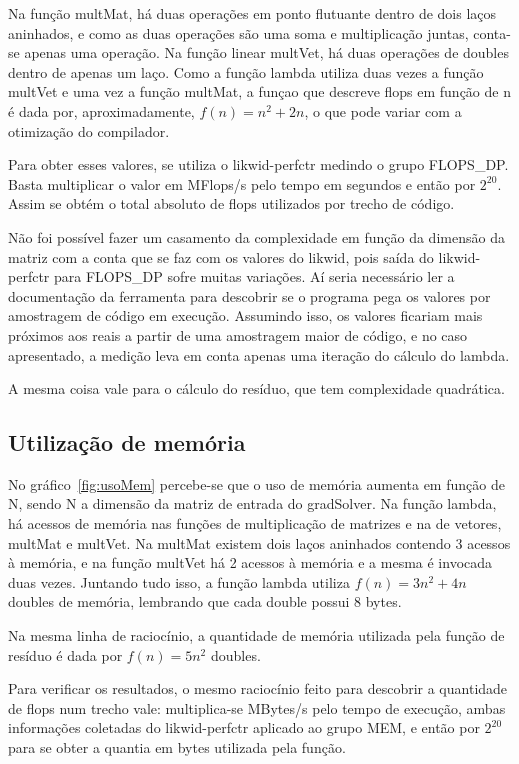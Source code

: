 \documentclass[12pt]{article}
\begin{document}
Na função multMat, há duas operações em ponto flutuante dentro de dois laços
aninhados, e como as duas operações são uma soma e multiplicação juntas,
conta-se apenas uma operação. Na função linear multVet, há duas operações de
doubles dentro de apenas um laço. Como a função lambda utiliza duas vezes a
função multVet e uma vez a função multMat, a funçao que descreve flops em função
de n é dada por, aproximadamente, $f(n) = n^2 + 2n$, o que pode variar com a
otimização do compilador.

Para obter esses valores, se utiliza o likwid-perfctr medindo o grupo FLOPS\_DP.
Basta multiplicar o valor em MFlops/s pelo tempo em segundos e então por
$2^{20}$. Assim se obtém o total absoluto de flops utilizados por trecho de
código.

Não foi possível fazer um casamento da complexidade em função da dimensão da
matriz com a conta que se faz com os valores do likwid, pois saída do
likwid-perfctr para FLOPS\_DP sofre muitas variações. Aí seria necessário ler a
documentação da ferramenta  para descobrir se o programa pega os valores por
amostragem de código em execução. Assumindo isso, os valores ficariam mais
próximos aos reais a partir de uma amostragem maior de código, e no caso
apresentado, a medição leva em conta apenas uma iteração do cálculo do lambda.

A mesma coisa vale para o cálculo do resíduo, que tem complexidade quadrática.

\subsection{Utilização de memória}\label{sec:utilizacaoMemoria}

No gráfico~\ref{fig:usoMem} percebe-se que o uso de memória aumenta em função de
N, sendo N a dimensão da matriz de entrada do gradSolver. Na função lambda, há
acessos de memória nas funções de multiplicação de matrizes e na de vetores,
multMat e multVet. Na multMat existem dois laços aninhados contendo 3 acessos à
memória, e na função multVet há 2 acessos à memória e a mesma é invocada duas
vezes. Juntando tudo isso, a função lambda utiliza $f(n) = 3n^2 + 4n$ doubles de
memória, lembrando que cada double possui 8 bytes.

Na mesma linha de raciocínio, a quantidade de memória utilizada pela função de
resíduo é dada por $f(n) = 5n^2$ doubles.

Para verificar os resultados, o mesmo raciocínio feito para descobrir a
quantidade de flops num trecho vale: multiplica-se MBytes/s pelo tempo de
execução, ambas informações coletadas do likwid-perfctr aplicado ao grupo MEM, e
então por $2^{20}$ para se obter a quantia em bytes utilizada pela função.
\end{document}

